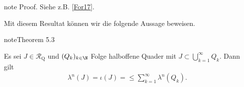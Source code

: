 \documentclass[letterpaper,10pt,english]{jupyterBook}
\begin{document}
\begin{sphinxadmonition}{note}
\sphinxAtStartPar
Proof. Siehe z.B. {[}\hyperlink{cite.references:id4}{For17}{]}.
\end{sphinxadmonition}

\sphinxAtStartPar
Mit diesem Resultat können wir die folgende Aussage beweisen.
\label{masstheorie/masstheorie:thm:lebesgue}
\begin{sphinxadmonition}{note}{Theorem 5.3}



\sphinxAtStartPar
Es sei \(J\in\mathcal{R}_{\text{Q}}\) und \((Q_k)_{k\in\N}\) Folge halboffene Quader mit \(J \subset \bigcup_{k=1}^\infty Q_k\).
Dann gilt
\begin{equation*}
\begin{split}\lambda^n(J) = \iota(J) = \leq \sum_{k=1}^\infty \lambda^n(Q_k).\end{split}
\end{equation*}\end{sphinxadmonition}
\end{document}
